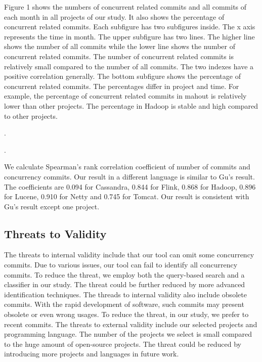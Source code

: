 Figure 1 shows the numbers of concurrent related commits and all commits of each month in all projects of our study. It also shows the percentage of concurrent related commits. Each subfigure has two subfigures inside. The x axis represents the time in month. The upper subfigure has two lines. The higher line shows the number of all commits while the lower line shows the number of concurrent related commits. The number of concurrent related commits is relatively small compared to the number of all commits. The two indexes have a positive correlation generally. The bottom subfigure shows the percentage of concurrent related commits. The percentages differ in project and time. For example, the percentage of concurrent related commits in mahout is relatively lower than other projects. The percentage in Hadoop is stable and high compared to other projects.


. 

. 

We calculate Spearman's rank correlation coefficient of number of commits and concurrency commits. Our result in a different language is similar to Gu's result. The coefficients are 0.094 for Cassandra, 0.844 for Flink, 0.868 for Hadoop, 0.896 for Lucene, 0.910 for Netty and 0.745 for Tomcat. Our result is consistent with Gu's result except one project.


\subsection{Threats to Validity}

The threats to internal validity include that our tool can omit some concurrency commits. Due to various issues, our tool can fail to identify all concurrency commits. To reduce the threat, we employ both the query-based search and a classifier in our study. The threat could be further reduced by more advanced identification techniques. The threads to internal validity also include obsolete commits. With the rapid development of software, such commits may present obsolete or even wrong usages. To reduce the threat, in our study, we prefer to recent commits. The threats to external validity include our selected projects and programming language. The number of the projects we select is small compared to the huge amount of open-source projects. The threat could be reduced by introducing more projects and languages in future work.

